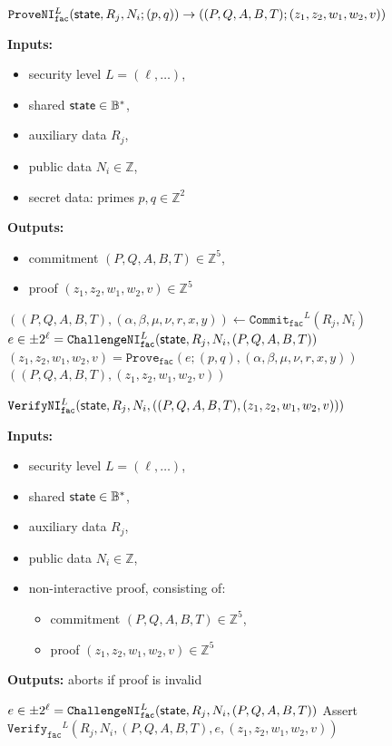 \documentclass[11pt]{article}
\newenvironment{inlineAlgorithm}{}{}
\newcommand{\algoName}[1]{#1 \par}
\newcommand{\algoInputsList}[1]{
    {\small \bf Inputs:} 
        \begin{itemize}[noitemsep,topsep=0pt]
            #1
        \end{itemize}
}
\newcommand{\algoOutputs}[1]{
    {\small \bf Outputs:} #1 \par
}
\newcommand{\algoOutputsList}[1]{
    {\small \bf Outputs:}
        \begin{itemize}[noitemsep,topsep=0pt]
            #1
        \end{itemize}
}
\def\state{{\sf state}}
\newcommand{\commit}[1]{\ensuremath{\mathtt{Commit}_{\mathtt{#1}}}}
\newcommand{\challengeni}[1]{\ensuremath{\mathtt{ChallengeNI}_{\mathtt{#1}}}}
\newcommand{\prove}[1]{\ensuremath{\mathtt{Prove}_{\mathtt{#1}}}}
\newcommand{\proveni}[1]{\ensuremath{\mathtt{ProveNI}_{\mathtt{#1}}}}
\newcommand{\verify}[1]{\ensuremath{\mathtt{Verify}_{\mathtt{#1}}}}
\newcommand{\verifyni}[1]{\ensuremath{\mathtt{VerifyNI}_{\mathtt{#1}}}}
\newcommand{\Z}{\mathbb{Z}}
\newcommand{\?}[1]{\stackrel{?}{#1}}
\newcommand{\Byte}{\ensuremath{\mathbb{B}}}
\begin{document}
\begin{description}

\item
\begin{inlineAlgorithm}
\algoName{$\proveni{fac}^L(\state, R_j, N_i; (p, q))
    \to ((P, Q, A, B, T); (z_1, z_2, w_1, w_2, v))$}
\algoInputsList{
    \item security level $L = (\ell, \dots)$,
    \item shared $\state \in \Byte^*$,
    \item auxiliary data $R_j$,
    \item public data $N_i \in \Z$,
    \item secret data: primes $p, q \in \Z^2$
}
\algoOutputsList{
    \item commitment $(P, Q, A, B, T) \in \Z^5$,
    \item proof $(z_1, z_2, w_1, w_2, v) \in \Z^5$
}
\begin{algorithmic}[1]
\State $((P, Q, A, B, T), (\alpha, \beta, \mu, \nu, r, x, y))
    \gets \commit{fac}^L(R_j, N_i)$
\State $e \in \pm 2^\ell = \challengeni{fac}^L(\state, R_j, N_i, (P, Q, A, B, T))$
\State $(z_1, z_2, w_1, w_2, v) = \prove{fac}(
    e;
    (p, q),
    (\alpha, \beta, \mu, \nu, r, x, y)
)$
\State \Return $((P, Q, A, B, T), (z_1, z_2, w_1, w_2, v))$
\end{algorithmic}
\end{inlineAlgorithm}

\item
\begin{inlineAlgorithm}
\algoName{$\verifyni{fac}^L(\state, R_j, N_i, ((P, Q, A, B, T), (z_1, z_2, w_1, w_2, v)))$}
\algoInputsList{
    \item security level $L = (\ell, \dots)$,
    \item shared $\state \in \Byte^*$,
    \item auxiliary data $R_j$,
    \item public data $N_i \in \Z$,
    \item non-interactive proof, consisting of:
        \begin{itemize}
        \item commitment $(P, Q, A, B, T) \in \Z^5$,
        \item proof $(z_1, z_2, w_1, w_2, v) \in \Z^5$
        \end{itemize}
}
\algoOutputs{aborts if proof is invalid}
\begin{algorithmic}[1]
\State $e \in \pm 2^\ell = \challengeni{fac}^L(\state, R_j, N_i, (P, Q, A, B, T))$
\State Assert $\verify{fac}^L(
    R_j,
    N_i,
    (P, Q, A, B, T),
    e,
    (z_1, z_2, w_1, w_2, v)
)$
\end{algorithmic}
\end{inlineAlgorithm}

\end{description}
\end{document}
